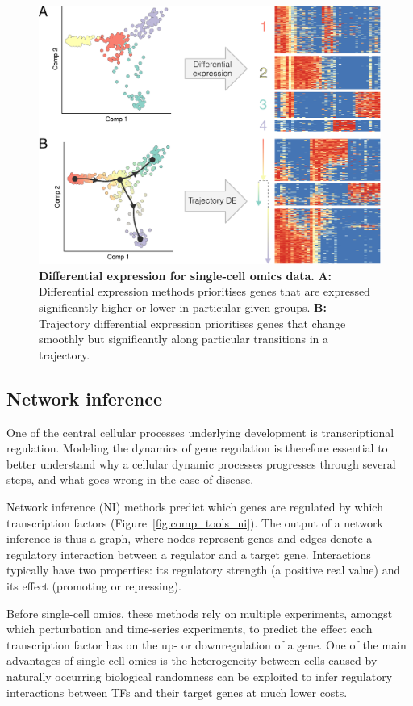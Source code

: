 \begin{figure}[htb!]
	\centering
	\includegraphics[width=.6\linewidth]{fig/comptools2/comptool_4_differentialexpression.pdf} 
	\caption{
		\textbf{Differential expression for single-cell omics data.}
		\textbf{A:} Differential expression methods prioritises genes that are expressed significantly higher or lower in particular given groups.
		\textbf{B:} Trajectory differential expression prioritises genes that change smoothly but significantly along particular transitions in a trajectory.
	}
	\label{fig:comp_tools_de}
\end{figure}

\subsection{Network inference}
One of the central cellular processes underlying development is transcriptional regulation. 	
Modeling the dynamics of gene regulation is therefore essential to better understand why a cellular dynamic processes progresses through several steps, and what goes wrong in the case of disease.

Network inference (NI) methods predict which genes are regulated by which transcription factors (Figure~\ref{fig:comp_tools_ni}). The output of a network inference is thus a graph, where nodes represent genes and edges denote a regulatory interaction between a regulator and a target gene. Interactions typically have two properties: its regulatory strength (a positive real value) and its effect (promoting or repressing).

Before single-cell omics, these methods rely on multiple experiments, amongst which perturbation and time-series experiments, to predict the effect each transcription factor has on the up- or downregulation of a gene. One of the main advantages of single-cell omics is the heterogeneity between cells caused by naturally occurring biological randomness\cite{padovan-merhar_usingvariabilitygene_2013} can be exploited to infer regulatory interactions between TFs and their target genes at much lower costs. 

